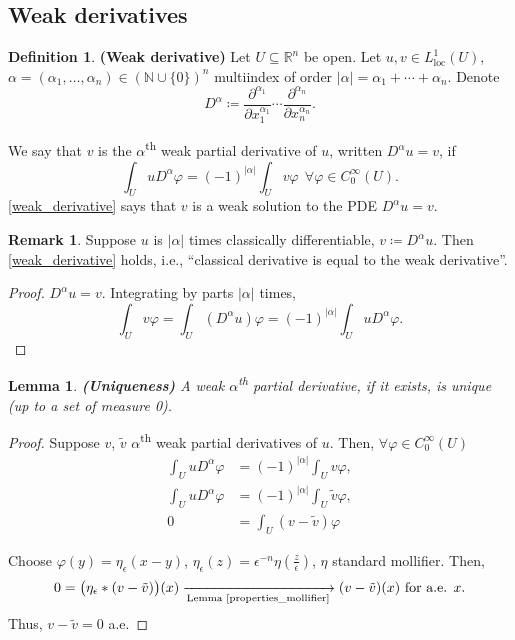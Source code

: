\documentclass[12pt]{article}
\newtheorem{lemma}{Lemma}[section]
\theoremstyle{definition}
\newtheorem{definition}{Definition}[section]
\newtheorem*{remark}{Remark}
\begin{document}
\subsection{Weak derivatives}
\begin{definition}
\textbf{(Weak derivative)} Let $U\subseteq\mathbb{R}^n$ be open. Let $u,v\in L_{\text{loc}}^1(U)$, $\alpha=(\alpha_1,\ldots,\alpha_n)\in(\mathbb{N}\cup\{0\})^n$ multiindex of order $|\alpha|=\alpha_1+\cdots+\alpha_n$. Denote
\[D^{\alpha}\coloneqq\frac{\partial^{\alpha_1}}{\partial x_1^{\alpha_1}}\cdots\frac{\partial^{\alpha_n}}{\partial x_n^{\alpha_n}}.\]

We say that $v$ is the $\alpha$\textsuperscript{th} weak partial derivative of $u$, written $D^{\alpha}u=v$, if
\begin{equation}\tag{$*$}\label{weak_derivative}
\int_UuD^{\alpha}\varphi=(-1)^{|\alpha|}\int_Uv\varphi\ \ \forall\varphi\in C_0^{\infty}(U).
\end{equation}
\eqref{weak_derivative} says that $v$ is a weak solution to the PDE $D^{\alpha}u=v$.
\end{definition}

\begin{remark}
Suppose $u$ is $|\alpha|$ times classically differentiable, $v\coloneqq D^{\alpha}u$. Then \eqref{weak_derivative} holds, i.e., ``classical derivative is equal to the weak derivative''.
\end{remark}

\begin{proof}
$D^{\alpha}u=v$. Integrating by parts $|\alpha|$ times,
\[\int_Uv\varphi=\int_U(D^{\alpha}u)\varphi=(-1)^{|\alpha|}\int_UuD^{\alpha}\varphi.\]
\end{proof}

\begin{lemma}
\emph{\textbf{(Uniqueness)}} A weak $\alpha$\textsuperscript{th} partial derivative, if it exists, is unique (up to a set of measure 0).
\end{lemma}

\begin{proof}
Suppose $v$, $\tilde{v}$ $\alpha$\textsuperscript{th} weak partial derivatives of $u$. Then, $\forall\varphi\in C_0^{\infty}(U)$
\begin{align*}
\int_UuD^{\alpha}\varphi&=(-1)^{|\alpha|}\int_Uv\varphi,\\
\int_UuD^{\alpha}\varphi&=(-1)^{|\alpha|}\int_U\tilde{v}\varphi,\\
0&=\int_U(v-\tilde{v})\varphi
\end{align*}

Choose $\varphi(y)=\eta_{\epsilon}(x-y)$, $\eta_{\epsilon}(z)=\epsilon^{-n}\eta(\frac{z}{\epsilon})$, $\eta$ standard mollifier. Then,
\[0=\big(\eta_{\epsilon}*(v-\tilde{v})\big)(x)\xrightarrow[\text{Lemma \ref{properties_mollifier}}]{}(v-\tilde{v})(x)\text{ for a.e. }x.\]
Thus, $v-\tilde{v}=0$ a.e.
\end{proof}
\end{document}
